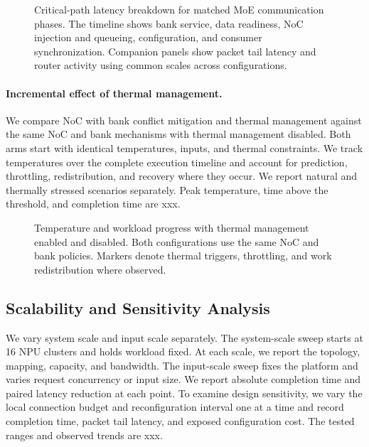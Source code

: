 \documentclass[conference,10pt]{IEEEtran}
\newcommand{\Description}[1]{}
\begin{document}
\begin{figure}[t]
\centering
\fbox{\rule{0pt}{17mm}\rule{0.92\textwidth}{0pt}}
\caption{Critical-path latency breakdown for matched MoE communication phases. The timeline shows bank service, data readiness, NoC injection and queueing, configuration, and consumer synchronization. Companion panels show packet tail latency and router activity using common scales across configurations.}
\Description{Reserved space for the critical-path breakdown and congestion panels.}
\label{fig:eval-breakdown}
\end{figure}

\paragraph{Incremental effect of thermal management.}
We compare NoC with bank conflict mitigation and thermal management against the same NoC and bank mechanisms with thermal management disabled. Both arms start with identical temperatures, inputs, and thermal constraints. We track temperatures over the complete execution timeline and account for prediction, throttling, redistribution, and recovery where they occur. We report natural and thermally stressed scenarios separately. Peak temperature, time above the threshold, and completion time are xxx.

\begin{figure}[t]
\centering
\fbox{\rule{0pt}{17mm}\rule{0.90\columnwidth}{0pt}}
\caption{Temperature and workload progress with thermal management enabled and disabled. Both configurations use the same NoC and bank policies. Markers denote thermal triggers, throttling, and work redistribution where observed.}
\Description{Reserved space for temperature and workload progress curves.}
\label{fig:eval-thermal}
\end{figure}

\subsection{Scalability and Sensitivity Analysis}

We vary system scale and input scale separately. The system-scale sweep starts at 16 NPU clusters and holds workload fixed. At each scale, we report the topology, mapping, capacity, and bandwidth. The input-scale sweep fixes the platform and varies request concurrency or input size. We report absolute completion time and paired latency reduction at each point. To examine design sensitivity, we vary the local connection budget and reconfiguration interval one at a time and record completion time, packet tail latency, and exposed configuration cost. The tested ranges and observed trends are xxx.
\end{document}
